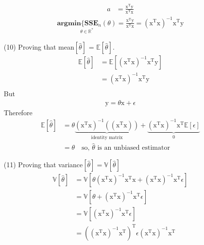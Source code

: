 \documentclass[12pt,a4paper]{article}
\begin{document}
\begin{enumerate}
\begin{align*}
						a &= \frac{\mathrm{x}^{\text{T} }\mathrm{y}}{\mathrm{x}^{\text{T} }\mathrm{x}  }
			\end{align*}
		\begin{align*}
				 \underset{\theta \in \mathbb{R}^ {*} } {\mathbf{argmin} \lbrace \textbf{SSE}_n(\theta ) }  = \frac{\mathrm{x}^{\text{T} }\mathrm{y}}{\mathrm{x}^{\text{T} }\mathrm{x}  }  = (\mathrm{x}^{\text{T} }\mathrm{x})^{-1} \mathrm{x}^{\text{T} }\mathrm{y}
		\end{align*}
		\item[(10)] Proving that mean$[\hat{\theta} ]$ = $\mathbb{E}[\hat{\theta}]$.
				\begin{align*}
						\mathbb{E}[\hat{\theta}] &=  \mathbb{E}[ (\mathrm{x}^{\text{T} }\mathrm{x})^{-1} \mathrm{x}^{\text{T} }\mathrm{y}] \\
						&=  (\mathrm{x}^{\text{T} }\mathrm{x})^{-1} \mathrm{x}^{\text{T} }\mathrm{y}\\ 
				\end{align*}
	But 
	\begin{align*}
			\mathrm{y} = \theta\mathrm{x} + \epsilon
	\end{align*}
Therefore 
		\begin{align*}
				\mathbb{E}[\hat{\theta}] &=   \theta \underbrace{ (\mathrm{x}^{\text{T} }\mathrm{x})^{-1} ((\mathrm{x}^{\text{T} }\mathrm{x}) )  }_{\text{identity matrix} } + \underbrace{ (\mathrm{x}^{\text{T} }\mathrm{x})^{-1}  \mathrm{x}^{\text{T}} \mathbb{E}[\epsilon] }_{0}\\
				&=  \theta \quad \text{so,  } \hat{\theta} \text{ is an unbiased estimator} 
		\end{align*}
		\item[(11)] Proving that variance$[\hat{\theta}] =  \mathbb{V}[\hat{\theta}]$  
				\begin{align*}
						 \mathbb{V}[\hat{\theta}] &=  \mathbb{V}[ \theta  (\mathrm{x}^{\text{T} }\mathrm{x})^{-1} \mathrm{x}^{\text{T} }\mathrm{x} +   (\mathrm{x}^{\text{T} }\mathrm{x})^{-1}  \mathrm{x}^{\text{T} }\epsilon  ]\\
						 &=   \mathbb{V}[ \theta +   (\mathrm{x}^{\text{T} }\mathrm{x})^{-1}  \mathrm{x}^{\text{T} }\epsilon  ]\\
						&=  \mathbb{V}[  (\mathrm{x}^{\text{T} }\mathrm{x})^{-1}  \mathrm{x}^{\text{T} }\epsilon  ]\\
							&=   ( (\mathrm{x}^{\text{T} }\mathrm{x})^{-1}  \mathrm{x}^{\text{T} })^{\text{T} } \mathbb{\epsilon }  (\mathrm{x}^{\text{T} }\mathrm{x})^{-1}  \mathrm{x}^{\text{T} }\\

\end{align*}
\end{enumerate}
\end{document}
